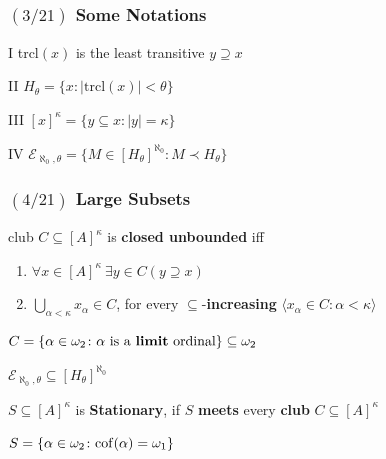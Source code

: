 \documentclass{beamer}
\newcommand{\cf}[1]{\rm{cof}(#1)}
\newcommand{\el}[1]{\mathcal{E}_{\aleph_0, #1}}
\begin{document}
\begin{frame}
\frametitle{$(3/21)$ \hspace{20mm} Some Notations}
\begin{alertblock}{I}
trcl$(x)$ is the least transitive $y\supseteq x$
\end{alertblock}
\pause
\begin{block}{II}
$H_{\theta}=\lbrace x \colon | \text{trcl}(x)|<\theta\rbrace$
\end{block}
\pause
\begin{alertblock}{III}
$[x]^{\kappa}=\lbrace y \subseteq x \colon |y|=\kappa \rbrace$
\end{alertblock}
\pause
\begin{block}{IV}
$\el{\theta}=\lbrace M \in [H_{\theta}]^{\aleph_0} \colon M \prec H_{\theta}\rbrace$
\end{block}
\end{frame}
\begin{frame}
\frametitle{$(4/21)$ \hspace{20mm} Large Subsets}
\begin{block}{club}
$C \subseteq [A]^{\kappa}$ is \textbf{closed unbounded} iff
\begin{enumerate}
\item
$\forall x \in [A]^{\kappa} \ \exists y \in C (y \supseteq x)$
\item
$\displaystyle \bigcup_{\alpha<\kappa}x_{\alpha} \in C$, for every $\subseteq$-\textbf{increasing} $\langle x_{\alpha}\in C\colon \alpha<\kappa \rangle$
\end{enumerate}
\end{block}
\pause
\begin{alertblock}{}
$C=\lbrace \alpha \in \omega_2 \colon \alpha \text{ is a \textbf{limit} ordinal}\rbrace \subseteq \omega_2$
\end{alertblock}
\begin{alertblock}{}
$\el{\theta}\subseteq [H_{\theta}]^{\aleph_0}$
\end{alertblock}
\pause
\begin{definition}
$S \subseteq [A]^{\kappa}$ is \textbf{Stationary}, if $S$ \textbf{meets} every \textbf{club} $C\subseteq [A]^{\kappa}$
\end{definition}
\begin{alertblock}{}
$S=\lbrace \alpha \in \omega_2 \colon \cf{\alpha}=\omega_1 \rbrace$
\end{alertblock}
\end{frame}
\end{document}
